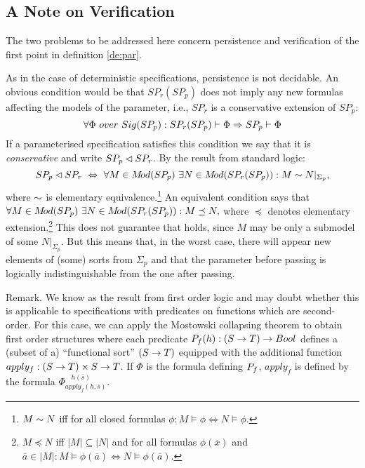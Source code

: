 \subsection{A Note on Verification}\label{sub:ver} The two problems to be addressed here concern persistence and verification of the first point in definition \ref{de:par}. 

As in the case of deterministic specifications, persistence is not decidable. An obvious condition would be that $SP_r(SP_p)$ 
does not imply any
new formulas affecting the models of the parameter, i.e., $SP_r$ is a conservative extension of $SP_p$:
\begin{equation}\label{eq:conservative}
\forall \Phi\ over\ Sig(SP_p) :
SP_r(SP_p)\vdash \Phi\mathrel\Rightarrow SP_p\vdash \Phi \end{equation}
If a parameterised specification satisfies this condition we say that it is {\em conservative} and write $SP_p\lhd SP_r$. By the result from standard logic: %
\begin{equation}\label{eq:cons}
SP_p\lhd SP_r\ \mathrel{\Leftrightarrow}\
\forall M\in M\!od(SP_p)\ \exists N\in M\!od(SP_r(SP_p)): M\sim N|_{\Sigma_{p}},
\end{equation}
where $\sim$ is elementary equivalence.\footnote{$M\sim N$ iff for all closed
formulas $\phi: M\models\phi\iff N\models\phi$.} An equivalent condition says that $\forall M\in M\!od(SP_p)\ \exists N\in M\!od(SP_r(SP_p)) : M\preceq N,$ where $\preceq$ denotes elementary extension.\footnote{$M\preceq N$ iff $|M|\subseteq |N|$ and for all formulas $\phi(\overline x)$ and $\overline a \in |M|: M\models \phi(\overline a) \iff N\models\phi(\overline a).$}
This does not guarantee that \re{eq:pers} holds, since $M$ may be only a submodel of some $N|_{\Sigma_{p}}$. But this means that, in the worst case, there will appear new elements of (some) sorts from $\Sigma_p$ and that the parameter before passing is logically indistinguishable from the one after passing.
\begin{SREMARK}{Remark.}
We know  as the result from first order logic and may doubt whether 
this is applicable to specifications with predicates on functions which are 
second-order. For this case, we can apply the Mostowski collapsing theorem
to obtain first order structures where each predicate $P_{f}(h):(S\rightarrow T)\rightarrow Bool$ defines a (subset of a) ``functional sort'' $(S\rightarrow T)$ equipped
with the additional function $apply_f:(S\rightarrow T)\times S\rightarrow T$. If $\Phi$ is the formula defining $P_{f}$, $apply_f$ is defined by the formula $\Phi_{apply_{f}(h,\overline s)}^{\ \ \ \ h(\overline s)}$. \end{SREMARK}
